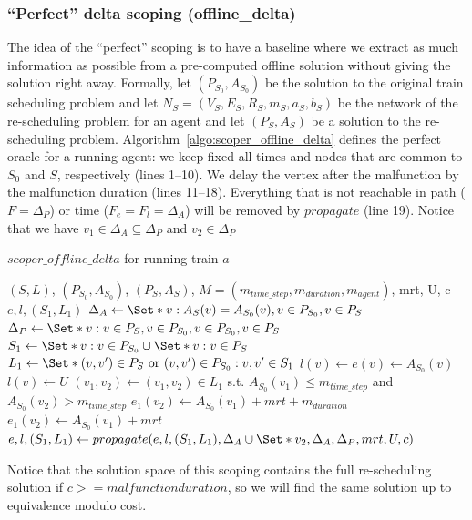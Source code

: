 \documentclass{article}
\begin{document}
\subsubsection{``Perfect'' delta scoping (offline\_delta)}
\label{subsubsec:scope_offline_delta}

The idea of the ``perfect'' scoping is to have a baseline where we extract as much information as possible from a pre-computed offline solution without giving the solution right away.
%
Formally, let $(P_{S_0},A_{S_0})$ be the solution to the original train scheduling problem
and let $N_S=(V_S,E_S,R_S,m_S,a_S,b_S)$ be the network of the re-scheduling problem for an agent
and  let $(P_S,A_S)$ be a solution to the re-scheduling problem. Algorithm~\ref{algo:scoper_offline_delta} defines the perfect oracle for a running agent: we keep fixed all times and nodes that are common to $S_0$ and $S$, respectively (lines 1--10).
We delay the vertex after the malfunction by the malfunction duration (lines 11--18).
Everything that is not reachable in path ($F=\Delta_P$) or time ($F_e=F_l=\Delta_A$) will be removed by $propagate$ (line 19). Notice that we have $v_1 \in \Delta_A \subseteq \Delta_P$ and $v_2 \in \Delta_P$


\begin{algorithm}
	\caption{$scoper\_offline\_delta$ for running train $a$} \label{algo:scoper_offline_delta}
	\begin{algorithmic}[1]
		\Require $(S,L)$, $(P_{S_0},A_{S_0})$, $(P_S,A_S)$, $M=(m_{time\_step},m_{duration},m_{agent})$, mrt, U, c
	    \Ensure $e,l,(S_1,L_1)$
	    \State $\Delta_A \leftarrow \Set*{v: A_S(v)=A_{S_0}(v), v\in P_{S_0}, v \in P_S}$
	    \State $\Delta_P \leftarrow \Set*{v: v\in P_S, v\in P_{S_0}, v\in P_{S_0}, v \in P_S}$
	    \State $S_1 \leftarrow \Set*{v: v\in P_{S_0}} \cup \Set*{v: v\in P_{S}}$
	    \State $L_1 \leftarrow \Set*{(v,v^\prime) \in P_S \textrm{ or } (v,v^\prime) \in P_{S_0}: v,v^\prime \in S_1}$
	        \State $l(v)\leftarrow e(v)\leftarrow A_{S_0}(v)$
	    \EndFor
	        \State $l(v) \leftarrow U$
	    \EndFor
	    \State $(v_1,v_2) \leftarrow (v_1,v_2) \in L_1$ s.t. $A_{S_0}(v_1)\leq m_{time\_step}$ and $A_{S_0}(v_2)>m_{time\_step}$
            \State $e_1(v_2) \leftarrow A_{S_0}(v_1)+mrt+m_{duration}$
        \Else
            \State $e_1(v_2) \leftarrow A_{S_0}(v_1)+mrt$
        \EndIf
        \EndIf
	    \State $e,l,(S_1,L_1) \leftarrow propagate(e,l,(S_1,L_1),\Delta_A \cup \Set*{v_2}, \Delta_A, \Delta_P, mrt, U, c)$
	\end{algorithmic}
\end{algorithm}
Notice that the solution space of this scoping contains the full re-scheduling solution if $c >= malfunction duration$, so we will find the same solution up to equivalence modulo cost.
\end{document}
